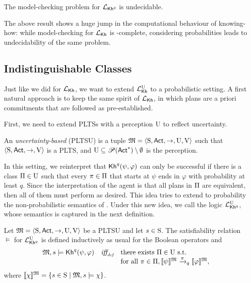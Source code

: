 \begin{theorem}\label{th:mc:PKh:undecidable}
  The model-checking problem for $\PKh$ is undecidable.
\end{theorem}

The above result shows a huge jump in the computational behaviour of
knowing-how: while model-checking for $\Khlogic$ is \PSPACE-complete,
considering probabilities leads to undecidability of the same problem.


\subsection{Indistinguishable Classes}\label{subsec:prob:indist:committed}

Just like we did for $\Khlogic$, we want to extend $\Khunc$ to a
probabilistic setting.  A first natural approach is to keep the same
spirit of $\Khlogic$, in which plans are a priori commitments that are
followed as pre-established.

First, we need to extend PLTSs with a perception $\Unc$ to
reflect uncertainty.

\begin{definition}\label{def:pltsu}
    An \emph{uncertainty-based \lts} (PLTSU) is a tuple
    $\model=\tup{\S,\Act,\ra,\Unc,\V}$ such that
    $\tup{\S,\Act,\ra,\V}$ is a PLTS, and $\Unc\subseteq
    \powerset(\Act^*)\setminus \emptyset$ is the perception.
\end{definition}

In this setting, we reinterpret that $\kh^q(\psi,\varphi)$ can only be
successful if there is a class $\plans\in\Unc$ such that every
$\plan\in\plans$ that starts at $\psi$ ends in $\varphi$ with
probability at least $q$.  Since the interpretation of the agent is
that all plans in $\plans$ are equivalent, then all of them must 
perform as desired.  This idea tries to extend to probability the
non-probabilistic semantics of .
Under this new idea, we call the logic $\PKhunc$, whose semantics is
captured in the next definition.


\begin{definition}\label{def:semantics:PKhunc}
  Let $\model = \tup{\S,\Act,\ra,\Unc,\V}$ be a PLTSU and let $s\in\S$.  The
  satisfiability relation $\models$ for $\PKhunc$ is defined inductively 
  as usual for the Boolean operators and
  \[
  \begin{array}{l@{\ \ \ }c@{\ \ \  }l}
    \model, s \models \kh^q(\psi,\varphi) & \iffdef &  \text{there exists } {\plans \in \Unc} \text{ s.t.} \\
    & & \text{for all } {\plan\in\plans}, {\truthset{\model}{\psi} \reach{\plan}_q \truthset{\model}{\varphi}}, 
  \end{array}
  \]    
  where $\truthset{\model}{\chi} = \csetsc{s\in\S}{\model,s\models\chi}$.
\end{definition}

